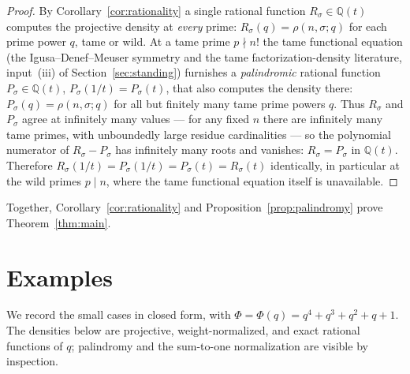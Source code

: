 \documentclass[pdflatex,sn-mathphys-num]{sn-jnl}%
\newcommand{\bbQ}{\mathbb{Q}}
\theoremstyle{plain}
\theoremstyle{definition}
\theoremstyle{remark}
\numberwithin{equation}{section}
\begin{document}
\begin{proof}
By Corollary~\ref{cor:rationality} a single rational function $R_{\sigma}\in\bbQ(t)$
computes the projective density at \emph{every} prime: $R_{\sigma}(q)=\rho(n,\sigma;q)$
for each prime power $q$, tame or wild. At a tame prime $p\nmid n!$ the tame functional
equation (the Igusa--Denef--Meuser symmetry and the tame factorization-density
literature, input~(iii) of Section~\ref{sec:standing}) furnishes a \emph{palindromic}
rational function $P_{\sigma}\in\bbQ(t)$, $P_{\sigma}(1/t)=P_{\sigma}(t)$, that also
computes the density there: $P_{\sigma}(q)=\rho(n,\sigma;q)$ for all but finitely many
tame prime powers $q$. Thus $R_{\sigma}$ and $P_{\sigma}$ agree at infinitely many
values --- for any fixed $n$ there are infinitely many tame primes, with unboundedly
large residue cardinalities --- so the polynomial numerator of $R_{\sigma}-P_{\sigma}$
has infinitely many roots and vanishes: $R_{\sigma}=P_{\sigma}$ in $\bbQ(t)$. Therefore
$R_{\sigma}(1/t)=P_{\sigma}(1/t)=P_{\sigma}(t)=R_{\sigma}(t)$ identically, in particular
at the wild primes $p\mid n$, where the tame functional equation itself is unavailable.
\end{proof}

Together, Corollary~\ref{cor:rationality} and Proposition~\ref{prop:palindromy}
prove Theorem~\ref{thm:main}.

\section{Examples}\label{sec:examples}

We record the small cases in closed form, with $\Phi=\Phi(q)=q^{4}+q^{3}+q^{2}+q+1$.
The densities below are projective, weight-normalized, and exact rational functions
of $q$; palindromy and the sum-to-one normalization are visible by inspection.
\end{document}
